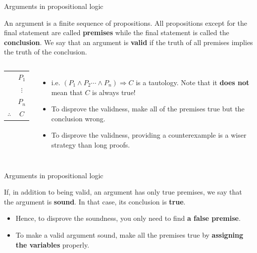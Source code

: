 \begin{frame}{Arguments in propositional logic}
    \begin{definition}
        An argument is a finite sequence of propositions. All propositions except for the final statement are called \textbf{premises} while the final statement is called the \textbf{conclusion}. We say that an argument is \textbf{valid} if the truth of all premises implies the truth of the conclusion.
    \end{definition}
    
    \begin{columns}[t,onlytextwidth]
        \begin{center}
            \begin{tabular}{cc}
                &$P_1$\\
                &$\vdots$\\
                &$P_n$\\\hline
                $\therefore$ & $C$
            \end{tabular}
        \end{center}

        \begin{itemize}
            \item 
            i.e. $(P_1\wedge P_2\cdots\wedge P_n)\Rightarrow C$ is a tautology. Note that it \textbf{does not} mean that $C$ is always true!
            \item
            To disprove the validness, make all of the premises true but the conclusion wrong.
            \item
            To disprove the validness, providing a counterexample is a wiser strategy than long proofs.
        \end{itemize}
        \end{columns}
\end{frame}

\begin{frame}{Arguments in propositional logic}
    \begin{definition}
        If, in addition to being valid, an argument has only true premises, we say that the argument is \textbf{sound}. In that case, its conclusion is \textbf{true}.
    \end{definition}
    \mypause
    \begin{itemize}
        \item Hence, to disprove the soundness, you only need to find \textbf{a false premise}.
        \item To make a valid argument sound, make all the premises true by \textbf{assigning the variables} properly.
    \end{itemize}
\end{frame}

